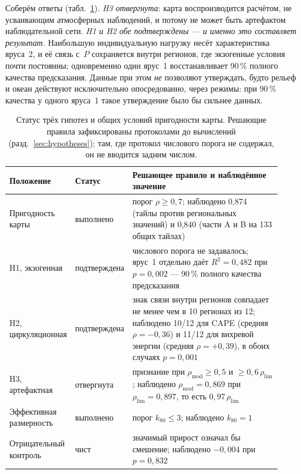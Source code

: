 \documentclass[11pt,a4paper]{article}
\begin{document}
Соберём ответы (табл.~\ref{tab:hyp}). \emph{H3 отвергнута}: карта воспроизводится расчётом, не усваивающим атмосферных наблюдений, и потому не может быть артефактом наблюдательной сети. \emph{H1 и H2 обе подтверждены --- и именно это составляет результат.} Наибольшую индивидуальную нагрузку несёт характеристика яруса~2, и её связь с~$P$ сохраняется внутри регионов, где экзогенные условия почти постоянны; одновременно один ярус~1 восстанавливает 90\,\% полного качества предсказания. Данные при этом \emph{не} позволяют утверждать, будто рельеф и океан действуют исключительно опосредованно, через режимы: при 90\,\% качества у одного яруса~1 такое утверждение было бы сильнее данных.

\begin{table}[t]
\centering
\caption{Статус трёх гипотез и общих условий пригодности карты. Решающие правила зафиксированы протоколами до вычислений (разд.~\ref{sec:hypotheses}); там, где протокол числового порога не содержал, он не вводится задним числом.}
\label{tab:hyp}
\small
\begin{tabular}{@{}p{0.20\linewidth}p{0.15\linewidth}p{0.57\linewidth}@{}}
\toprule
Положение & Статус & Решающее правило и наблюдённое значение\\
\midrule
Пригодность карты & выполнено & порог $\rho\ge0{,}7$; наблюдено 0,874 (тайлы против региональных значений) и 0,840 (части A и B на 133 общих тайлах)\\
H1, экзогенная & подтверждена & числового порога не задавалось; ярус~1 отдельно даёт $R^2=0{,}482$ при $p=0{,}002$ --- 90\,\% полного качества предсказания\\
H2, циркуляционная & подтверждена & знак связи внутри регионов совпадает не менее чем в 10 регионах из 12; наблюдено 10/12 для CAPE (средняя $\rho=-0{,}36$) и 11/12 для вихревой энергии (средняя $\rho=+0{,}39$), в обоих случаях $p=0{,}001$\\
H3, артефактная & отвергнута & признание при $\rho_{\mathrm{mod}}\ge0{,}5$ и $\ge0{,}6\,\rho_{\mathrm{lim}}$; наблюдено $\rho_{\mathrm{mod}}=0{,}869$ при $\rho_{\mathrm{lim}}=0{,}897$, то есть $0{,}97\,\rho_{\mathrm{lim}}$\\
Эффективная размерность & выполнено & порог $k_{80}\le3$; наблюдено $k_{80}=1$\\
Отрицательный контроль & чист & значимый прирост означал бы смешение; наблюдено $-0{,}004$ при $p=0{,}832$\\
\bottomrule
\end{tabular}
\end{table}
\end{document}
